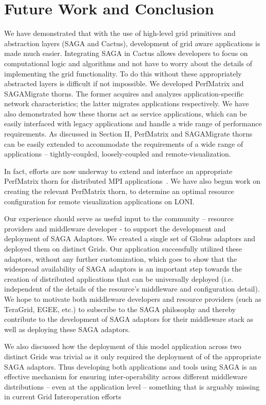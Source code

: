 \documentclass[conference,final]{IEEEtran}
\begin{document}
\section{Future Work and Conclusion}

We have demonstrated that with the use of high-level grid primitives
and abstraction layers (SAGA and Cactus), development of grid aware
applications is made much easier. Integrating SAGA in Cactus allows
developers to focus on computational logic and algorithms and not have
to worry about the details of implementing the grid functionality. To
do this without these appropriately abstracted layers is difficult if
not impossible.  We developed PerfMatrix and SAGAMigrate thorns.  The
former acquires and analyzes application-specific network
characteristics; the latter migrates applications respectively.  We
have also demonstrated how these thorns act as service applications,
which can be easily interfaced with legacy applications and handle a
wide range of performance requirements. As discussed in Section II,
PerfMatrix and SAGAMigrate thorns can be easily extended to accommodate
the requirements of a wide range of applications -- tightly-coupled,
loosely-coupled and remote-visualization.

In fact, efforts are now underway to extend and interface an
appropriate PerfMatrix thorn for distributed MPI
applications~\cite{clade06}.  We have also begun work on creating the
relevant PerfMatrix thorn, to determine an optimal resource
configuration for remote visualization applications on LONI.

Our experience should serve as useful input to the community --
resource providers and middleware developer - to support the
development and deployment of SAGA Adaptors.  We created a single set
of Globus adaptors and deployed them on distinct Grids. Our
application successfully utilized these adaptors, without any further
customization, which goes to show that the widespread availability of
SAGA adaptors is an important step towards the creation of distributed
applications that can be universally deployed (i.e.  independent of
the details of the resource's middleware and configuration detail). We
hope to motivate both middleware developers and resource providers
(such as TeraGrid, EGEE, etc.) to subscribe to the SAGA philosophy and
thereby contribute to the development of SAGA adaptors for their
middleware stack as well as deploying these SAGA adaptors.

We also discussed how the deployment of this model application across
two distinct Grids was trivial as it only required the deployment of
of the appropriate SAGA adaptors.  Thus developing both applications
and tools using SAGA is an effective mechanism for ensuring
inter-operability across different middleware distributions -- even at
the application level -- something that is arguably missing in current
Grid Interoperation efforts~\cite{gin_paper}
\end{document}
